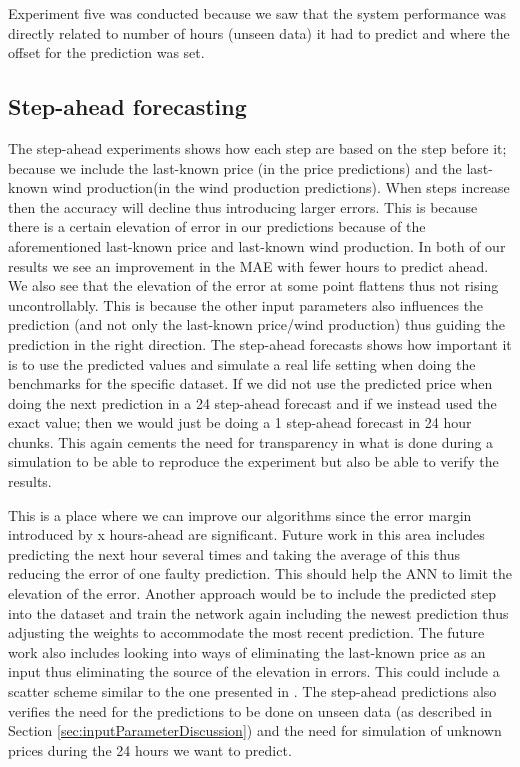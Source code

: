 Experiment five was conducted because we saw that the system performance was directly related to number of hours (unseen data) it had to predict and where the offset for the prediction was set.
\subsection{Step-ahead forecasting}
\label{sec:stepAheadDiscussion}
The step-ahead experiments shows how each step are based on the step before it; because we include the last-known price (in the price predictions) and the last-known wind production(in the wind production predictions). When steps increase then the accuracy will decline thus introducing larger errors. This is because there is a certain elevation of error in our predictions because of the aforementioned last-known price and last-known wind production. In both of our results we see an improvement in the MAE with fewer hours to predict ahead. We also see that the elevation of the error at some point flattens thus not rising uncontrollably. This is because the other input parameters also influences the prediction (and not only the last-known price/wind production) thus guiding the prediction in the right direction. The step-ahead forecasts shows how important it is to use the predicted values and simulate a real life setting when doing the benchmarks for the specific dataset. If we did not use the predicted price when doing the next prediction in a 24 step-ahead forecast and if we instead used the exact value; then we would just be doing a 1 step-ahead forecast in 24 hour chunks. This again cements the need for transparency in what is done during a simulation to be able to reproduce the experiment but also be able to verify the results.

This is a place where we can improve our algorithms since the error margin introduced by x hours-ahead are significant. Future work in this area includes predicting the next hour several times and taking the average of this thus reducing the error of one faulty prediction. This should help the ANN to limit the elevation of the error. Another approach would be to include the predicted step into the dataset and train the network again including the newest prediction thus adjusting the weights to accommodate the most recent prediction. The future work also includes looking into ways of eliminating the last-known price as an input thus eliminating the source of the elevation in errors. This could include a scatter scheme similar to the one presented in \cite{singhal2011electricity}. The step-ahead predictions also verifies the need for the predictions to be done on unseen data (as described in Section \ref{sec:inputParameterDiscussion}) and the need for simulation of unknown prices during the 24 hours we want to predict. 

